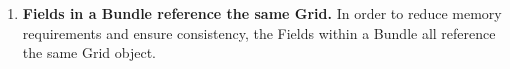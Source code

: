 

\begin{enumerate}

\item{\bf Fields in a Bundle reference the same Grid.}
In order to reduce memory requirements and ensure consistency, the 
Fields within a Bundle all reference the same Grid object.

\end{enumerate}



